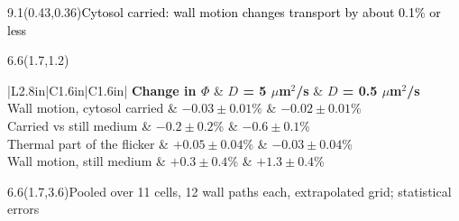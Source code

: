 \documentclass[t]{beamer}
\newcommand{\gtitle}[1]{\begin{textblock}{9.1}(0.43,0.36)\fontsize{20}{24}\selectfont\textcolor{black}{#1}\end{textblock}}
\newcommand{\gbox}[4]{\begin{textblock}{#3}(#1,#2)#4\end{textblock}}
\begin{document}
\begin{frame}
\gtitle{Cytosol carried: wall motion changes transport by about 0.1\% or less}
\gbox{1.7}{1.2}{6.6}{\fontsize{15}{18}\selectfont\renewcommand{\arraystretch}{1.75}%
\begin{tabular}{|L{2.8in}|C{1.6in}|C{1.6in}|}
\hline
\textbf{Change in $\Phi$} & \textbf{$D$ = 5 $\mu$m$^2$/s} & \textbf{$D$ = 0.5 $\mu$m$^2$/s} \\ \hline
Wall motion, cytosol carried & $-0.03\pm0.01$\% & $-0.02\pm0.01$\% \\ \hline
Carried vs still medium & $-0.2\pm0.2$\% & $-0.6\pm0.1$\% \\ \hline
Thermal part of the flicker & $+0.05\pm0.04$\% & $-0.03\pm0.04$\% \\ \hline
Wall motion, still medium & $+0.3\pm0.4$\% & $+1.3\pm0.4$\% \\ \hline
\end{tabular}}
\gbox{1.7}{3.6}{6.6}{\centering\fontsize{13}{15}\selectfont\textcolor{cap}{Pooled over 11 cells, 12 wall paths each,
extrapolated grid; statistical errors}}
\end{frame}
\end{document}
